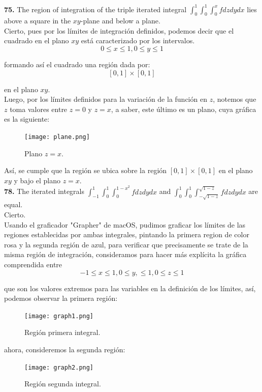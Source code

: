\documentclass[11pt]{report}
\begin{document}
\textbf{75.} The region of integration of the triple iterated integral
$\int_0^1 \int_0^1 \int_0^x f dz dy dx $ lies above a square in the $xy$-plane
and below a plane. \\

Cierto, pues por los límites de integración definidos, podemos decir que el
cuadrado en el plano $xy$ está caracterizado por los intervalos.
	$$ 0 \leq x \leq 1, 0 \leq y \leq 1 $$

formando así el cuadrado una región dada por:
	$$ [0,1] \times [0,1] $$

en el plano $xy$.\\

Luego, por los límites definidos para la variación de la función en $z$, notemos
que $z$ toma valores entre $z = 0$ y $z = x$, a saber, este último es un plano,
cuya gráfica es la siguiente:

\begin{figure}[H]
	\texttt{[image: plane.png]}
	\centering
	\caption{Plano $z = x$.}
	\centering
\end{figure}

Así, se cumple que la región se ubica sobre la región $[0,1] \times [0,1]$ en el
plano $xy$ y bajo el plano $z = x$.\\

\textbf{78.} The iterated integrals $\int_{-1}^1 \int_0^1 \int_0^{1-x^2} f dz dy dx $
and $\int_0^1 \int_0^1 \int_{-\sqrt{1-z}}^{\sqrt{1-z}} f dz dy dx $ are equal. \\

Cierto.\\
Usando el graficador "Grapher" de macOS, pudimos graficar los límites de las
regiones establecidas por ambas integrales, pintando la primera region
de color rosa y la segunda región de azul, para verificar que precisamente se
trate de la misma región de integración, consideramos para hacer más explícita
la gráfica comprendida entre
	$$ -1 \leq x \leq 1, 0 \leq y, \leq 1, 0 \leq z \leq 1 $$

que son los valores extremos para las variables en la definición de los límites,
así, podemos observar la primera región:

\begin{figure}[H]
	\texttt{[image: graph1.png]}
	\centering
	\caption{Región primera integral.}
	\centering
\end{figure}

ahora, consideremos la segunda región:
\begin{figure}[H]
	\texttt{[image: graph2.png]}
	\centering
	\caption{Región segunda integral.}
	\centering
\end{figure}
\end{document}
